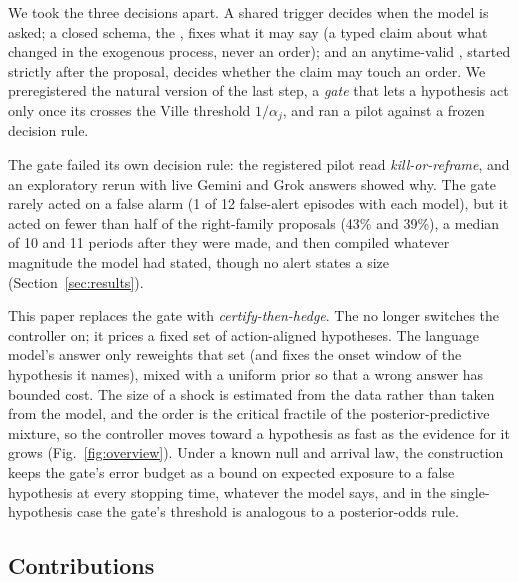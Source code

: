 We took the three decisions apart. A shared trigger decides when the model is asked; a closed
schema, the \shockspec{}, fixes what it may say (a typed claim about what changed in the
exogenous process, never an order); and an anytime-valid \eprocess{}, started strictly after
the proposal, decides whether the claim may touch an order. We preregistered the natural
version of the last step, a \emph{gate} that lets a hypothesis act only once its \eprocess{}
crosses the Ville threshold $1/\alpha_j$, and ran a pilot against a frozen decision rule.

The gate failed its own decision rule: the registered pilot read \emph{kill-or-reframe}, and
an exploratory rerun with live Gemini and Grok answers showed why. The gate rarely acted on a
false alarm (1 of 12 false-alert episodes with each model), but it acted on fewer than half of
the right-family proposals (43\% and 39\%), a median of 10 and 11 periods after they were made,
and then compiled whatever magnitude the model had stated, though no alert states a size
(Section~\ref{sec:results}).

This paper replaces the gate with \emph{certify-then-hedge}. The \eprocess{} no longer switches
the controller on; it prices a fixed set of action-aligned hypotheses. The language model's
answer only reweights that set (and fixes the onset window of the hypothesis it names), mixed
with a uniform prior so that a wrong answer has bounded cost. The size of a shock is estimated
from the data rather than taken from the model, and the order is the critical fractile of the
posterior-predictive mixture, so the controller moves toward a hypothesis as fast as the
evidence for it grows (Fig.~\ref{fig:overview}). Under a known null and arrival law, the construction keeps the
gate's error budget as a bound on expected exposure to a false hypothesis at every stopping
time, whatever the model says, and in the single-hypothesis case the gate's threshold is
analogous to a posterior-odds rule.


\subsection*{Contributions}

